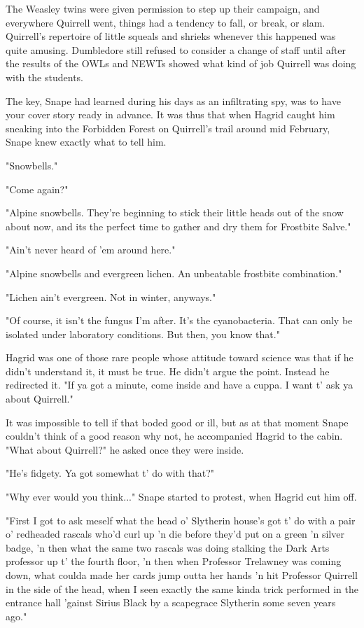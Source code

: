 \documentclass[a4paper,11pt]{article}
\begin{document}
The Weasley twins were given permission to step up their campaign, and everywhere Quirrell went, things had a tendency to fall, or break, or slam. Quirrell's repertoire of little squeals and shrieks whenever this happened was quite amusing. Dumbledore still refused to consider a change of staff until after the results of the OWLs and NEWTs showed what kind of job Quirrell was doing with the students.

The key, Snape had learned during his days as an infiltrating spy, was to have your cover story ready in advance. It was thus that when Hagrid caught him sneaking into the Forbidden Forest on Quirrell's trail around mid February, Snape knew exactly what to tell him.

"Snowbells."

"Come again?"

"Alpine snowbells. They're beginning to stick their little heads out of the snow about now, and its the perfect time to gather and dry them for Frostbite Salve."

"Ain't never heard of 'em around here."

"Alpine snowbells and evergreen lichen. An unbeatable frostbite combination."

"Lichen ain't evergreen. Not in winter, anyways."

"Of course, it isn't the fungus I'm after. It's the cyanobacteria. That can only be isolated under laboratory conditions. But then, you know that."

Hagrid was one of those rare people whose attitude toward science was that if he didn't understand it, it must be true. He didn't argue the point. Instead he redirected it. "If ya got a minute, come inside and have a cuppa. I want t' ask ya about Quirrell."

It was impossible to tell if that boded good or ill, but as at that moment Snape couldn't think of a good reason why not, he accompanied Hagrid to the cabin. "What about Quirrell?" he asked once they were inside.

"He's fidgety. Ya got somewhat t' do with that?"

"Why ever would you think..." Snape started to protest, when Hagrid cut him off.

"First I got to ask meself what the head o' Slytherin house's got t' do with a pair o' redheaded rascals who'd curl up 'n die before they'd put on a green 'n silver badge, 'n then what the same two rascals was doing stalking the Dark Arts professor up t' the fourth floor, 'n then when Professor Trelawney was coming down, what coulda made her cards jump outta her hands 'n hit Professor Quirrell in the side of the head, when I seen exactly the same kinda trick performed in the entrance hall 'gainst Sirius Black by a scapegrace Slytherin some seven years ago."
\end{document}
